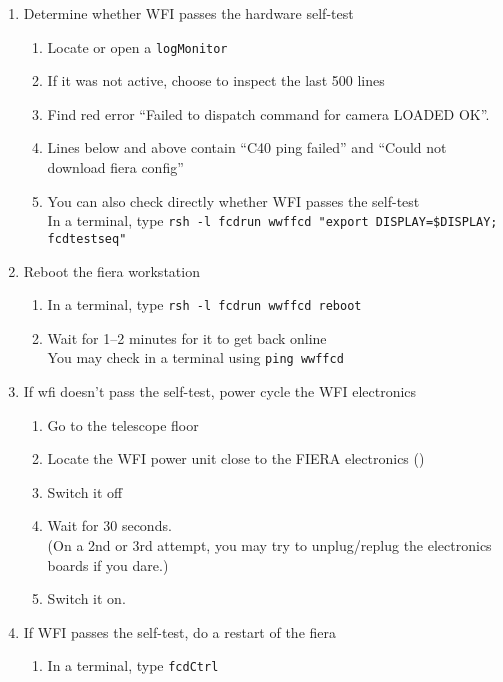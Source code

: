 \documentclass[11pt,fleqn,a4paper]{book}
\begin{document}
\begin{enumerate}
  \item Determine whether WFI passes the hardware self-test
    \begin{enumerate}
	\item Locate or open a \texttt{logMonitor}
	\item If it was not active, choose to inspect the last 500 lines
	\item Find red error ``Failed to dispatch command for camera LOADED OK''.
	\item Lines below and above contain ``C40 ping failed'' and ``Could not download \gls{fiera} config''
	\item You can also check directly whether WFI passes the self-test\\
              In a terminal, type \texttt{rsh -l fcdrun \gls{wwffcd} "export DISPLAY=\$DISPLAY; fcdtestseq"}
    \end{enumerate}
  \item\label{list:wfionline:reboot} Reboot the \gls{fiera} workstation
	\begin{enumerate}
		\item In a terminal, type \texttt{rsh -l fcdrun \gls{wwffcd} reboot}
	        \item Wait for 1--2 minutes for it to get back online\\
		      You may check in a terminal using \texttt{ping \gls{wwffcd}}
	\end{enumerate}
  \item If \gls{wfi} doesn't pass the self-test, \gls{power cycle} the WFI electronics 
	\begin{enumerate}
		\item Go to the telescope floor
		\item Locate the WFI power unit close to the FIERA electronics
			()
		\item Switch it off
                \item Wait for 30 seconds.\\
                      (On a 2nd or 3rd attempt, you may try to unplug/replug the electronics boards if you dare.)
		\item Switch it on.
	\end{enumerate}
  \item  If WFI passes the self-test, do a restart of the \gls{fiera} 
        \begin{enumerate}
		\item In a terminal, type \texttt{fcdCtrl}

\end{enumerate}
\end{enumerate}
\end{document}
